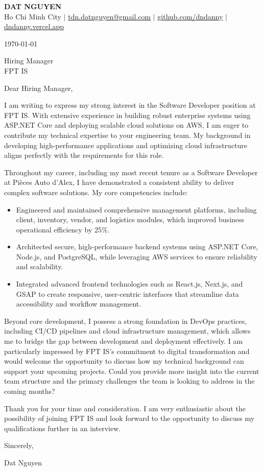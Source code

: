 \documentclass[letterpaper,11pt]{article}
\begin{document}
\begin{center}
\textbf{\Huge \scshape DAT NGUYEN} \\ \vspace{1pt}
\small Ho Chi Minh City $|$ \href{mailto:tdn.datnguyen@gmail.com}{\underline{tdn.datnguyen@gmail.com}} $|$
\href{https://github.com/dndanny}{\underline{github.com/dndanny}} $|$
\href{https://dndanny.vercel.app}{\underline{dndanny.vercel.app}}
\end{center}

\today

Hiring Manager \\
FPT IS

Dear Hiring Manager,

I am writing to express my strong interest in the Software Developer position at FPT IS. With extensive experience in building robust enterprise systems using ASP.NET Core and deploying scalable cloud solutions on AWS, I am eager to contribute my technical expertise to your engineering team. My background in developing high-performance applications and optimizing cloud infrastructure aligns perfectly with the requirements for this role.

Throughout my career, including my most recent tenure as a Software Developer at Pièces Auto d'Alex, I have demonstrated a consistent ability to deliver complex software solutions. My core competencies include:
\begin{itemize}
    \item Engineered and maintained comprehensive management platforms, including client, inventory, vendor, and logistics modules, which improved business operational efficiency by 25\%.
    \item Architected secure, high-performance backend systems using ASP.NET Core, Node.js, and PostgreSQL, while leveraging AWS services to ensure reliability and scalability.
    \item Integrated advanced frontend technologies such as React.js, Next.js, and GSAP to create responsive, user-centric interfaces that streamline data accessibility and workflow management.
\end{itemize}
Beyond core development, I possess a strong foundation in DevOps practices, including CI/CD pipelines and cloud infrastructure management, which allows me to bridge the gap between development and deployment effectively. I am particularly impressed by FPT IS's commitment to digital transformation and would welcome the opportunity to discuss how my technical background can support your upcoming projects. Could you provide more insight into the current team structure and the primary challenges the team is looking to address in the coming months?

Thank you for your time and consideration. I am very enthusiastic about the possibility of joining FPT IS and look forward to the opportunity to discuss my qualifications further in an interview.

Sincerely,

Dat Nguyen
\end{document}
